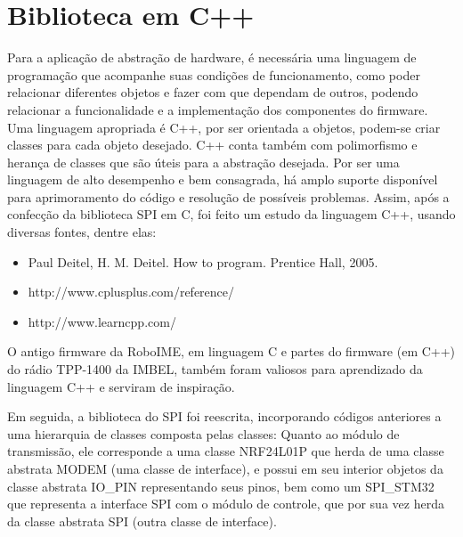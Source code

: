 \chapter{Biblioteca em C++}\label{cap:bibl_cpp}

Para a aplicação de abstração de hardware, é necessária uma linguagem de programação que acompanhe suas condições de funcionamento, como poder relacionar diferentes objetos e fazer com que dependam de outros, podendo relacionar a funcionalidade e a implementação dos componentes do firmware. Uma linguagem apropriada é C++, por ser orientada a objetos, podem-se criar classes para cada objeto desejado. C++ conta também com polimorfismo e herança de classes que são úteis para a abstração desejada. Por ser uma linguagem de alto desempenho e bem consagrada, há amplo suporte disponível para aprimoramento do código e resolução de possíveis problemas.
Assim, após a confecção da biblioteca SPI em C, foi feito um estudo da linguagem C++, usando diversas fontes, dentre elas:
\begin{itemize}
\item Paul Deitel, H. M. Deitel. How to program. Prentice Hall, 2005.
\item http://www.cplusplus.com/reference/
\item http://www.learncpp.com/
\end{itemize}

O antigo firmware da RoboIME, em linguagem C e partes do firmware (em C++) do rádio TPP-1400 da IMBEL, também foram valiosos para aprendizado da linguagem C++ e serviram de inspiração.

Em seguida, a biblioteca do SPI foi reescrita, incorporando códigos anteriores a uma hierarquia de classes composta pelas classes:
Quanto ao módulo de transmissão, ele corresponde a uma classe NRF24L01P que herda de uma classe abstrata MODEM (uma classe de interface), e possui em seu interior objetos da classe abstrata IO_PIN representando seus pinos, bem como um SPI_STM32 que representa a interface SPI com o módulo de controle, que por sua vez herda da classe abstrata SPI (outra classe de interface).



